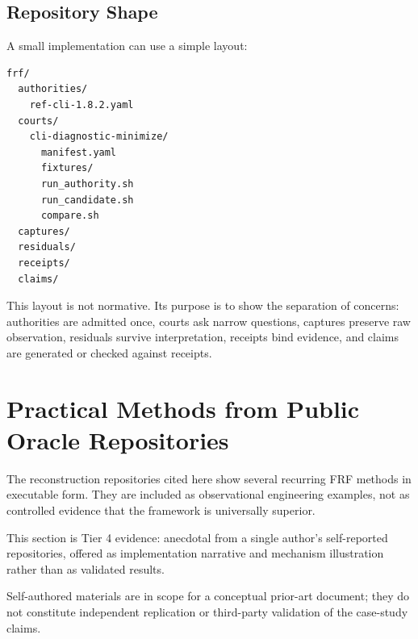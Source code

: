 \documentclass[11pt,a4paper]{article}
\newcommand{\frf}{\textsc{FRF}}
\begin{document}
\subsection{Repository Shape}

A small implementation can use a simple layout:
\begin{verbatim}
frf/
  authorities/
    ref-cli-1.8.2.yaml
  courts/
    cli-diagnostic-minimize/
      manifest.yaml
      fixtures/
      run_authority.sh
      run_candidate.sh
      compare.sh
  captures/
  residuals/
  receipts/
  claims/
\end{verbatim}

This layout is not normative. Its purpose is to show the separation of concerns: authorities are admitted once, courts ask narrow questions, captures preserve raw observation, residuals survive interpretation, receipts bind evidence, and claims are generated or checked against receipts.

\section{Practical Methods from Public Oracle Repositories}
\label{sec:public-methods}

The reconstruction repositories cited here show several recurring \frf{} methods in executable form. They are included as observational engineering examples, not as controlled evidence that the framework is universally superior.

This section is Tier 4 evidence: anecdotal from a single author's self-reported repositories, offered as implementation narrative and mechanism illustration rather than as validated results.

Self-authored materials are in scope for a conceptual prior-art document; they do not constitute independent replication or third-party validation of the case-study claims.
\end{document}
